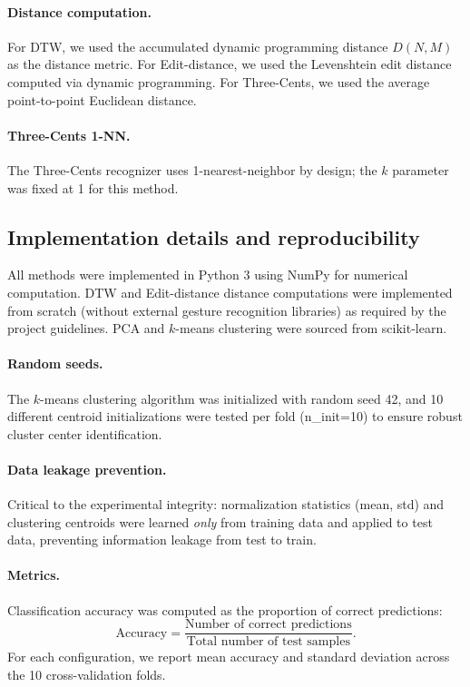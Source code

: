 \paragraph{Distance computation.} For DTW, we used the accumulated dynamic
programming distance $D(N, M)$ as the distance metric. For Edit-distance, we
used the Levenshtein edit distance computed via dynamic programming. For
Three-Cents, we used the average point-to-point Euclidean distance.
 
\paragraph{Three-Cents 1-NN.} The Three-Cents recognizer uses 1-nearest-neighbor
by design; the $k$ parameter was fixed at 1 for this method.
 
\subsection{Implementation details and reproducibility}
 
All methods were implemented in Python 3 using NumPy for numerical computation.
DTW and Edit-distance distance computations were implemented from scratch
(without external gesture recognition libraries) as required by the project
guidelines. PCA and $k$-means clustering were sourced from scikit-learn.
 
\paragraph{Random seeds.} The $k$-means clustering algorithm was initialized
with random seed 42, and 10 different centroid initializations were tested per
fold (n\_init=10) to ensure robust cluster center identification.
 
\paragraph{Data leakage prevention.} Critical to the experimental integrity:
normalization statistics (mean, std) and clustering centroids were learned
\emph{only} from training data and applied to test data, preventing information
leakage from test to train.
 
\paragraph{Metrics.} Classification accuracy was computed as the proportion of
correct predictions:
\begin{equation}
    \text{Accuracy} = \frac{\text{Number of correct predictions}}{\text{Total number of test samples}} .
\end{equation}
For each configuration, we report mean accuracy and standard deviation across
the 10 cross-validation folds.

